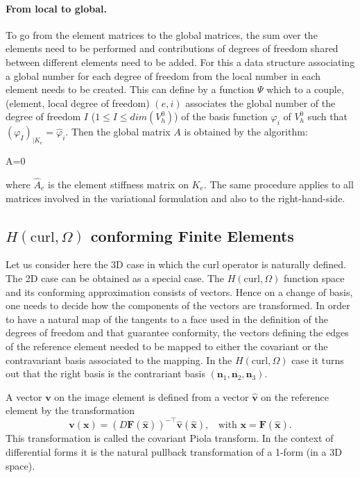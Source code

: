\paragraph{From local to global.}
To go from the element matrices to the global matrices, the sum over the elements need to be performed and contributions of degrees of freedom shared between different elements need to be added.
For this a data structure associating a global number for each degree of freedom from the local number in each 
element needs to be created. This can define by a function
 $\Psi$ which to a couple, (element, local degree of freedom)
$(e,i)$ associates the global number of the degree of freedom $I$ ($1\leq I\leq dim(V^0_h)$) of the  basis function 
$\varphi_i$ of $V^0_h$ such that $(\varphi_I)_{|K_e}=\hat{\varphi}_i$.
Then the global matrix $A$ is obtained by the algorithm:

\begin{algorithm}[H]
A=0\;
\end{algorithm}
where $\hat{A}_e$ is the element stiffness matrix on $K_e$. The same procedure applies to all matrices involved in the variational formulation and also to the right-hand-side.


\subsection{$H(\textrm{curl}, \Omega)$ conforming Finite Elements}

Let us consider here the 3D case in which the curl operator is naturally defined. The 2D case can be obtained as a special case. 
The $H(\textrm{curl}, \Omega)$ function space and its conforming approximation consists of vectors. Hence on a change of basis, one needs to decide how the components of the vectors are transformed. In order to have a natural map of the  tangents to a face used in the definition of the degrees of freedom and that guarantee conformity, the vectors defining the edges of the reference element needed to be mapped to either the covariant or the contravariant basis associated to the mapping. In the  $H(\textrm{curl}, \Omega)$ case it turns out that the right basis is the contrariant basis $( \mathbf{n}_1, \mathbf{n}_2, \mathbf{n}_3)$.



A vector $ \mathbf{v}$ on the image element is defined from a vector $ \hat{ \mathbf{v}}$ on the reference element by the transformation
\begin{equation}\label{eq:piolahrot}
\mathbf{v}( \mathbf{x}) =  (D \mathbf{F}(\hat{\mathbf{x}}))^{-\top} \hat{\mathbf{v}} (\hat{\mathbf{x}}), ~~~~\mbox{with } \mathbf{x} = \mathbf{F}(\hat{\mathbf{x}}).
\end{equation}
 This transformation is called the covariant Piola transform. In the context of differential forms it is the natural pullback transformation of a 1-form (in a 3D space). 
 
